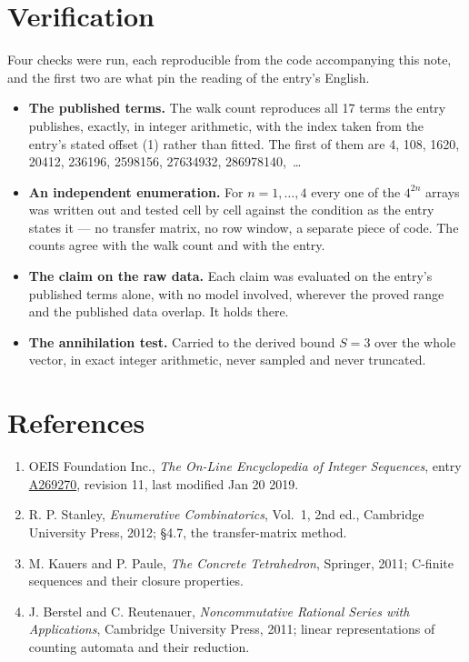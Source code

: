 \documentclass[11pt]{article}
\theoremstyle{definition}
\begin{document}
\section{Verification}

Four checks were run, each reproducible from the code accompanying this note, and the first two are what pin the reading of the entry's English.

\begin{itemize}

\item {\bfseries The published terms.} The walk count reproduces all 17 terms the entry publishes, exactly, in integer arithmetic, with the index taken from the entry's stated offset (1) rather than fitted. The first of them are 4, 108, 1620, 20412, 236196, 2598156, 27634932, 286978140,~\dots

\item {\bfseries An independent enumeration.} For $n = 1,\dots,4$ every one of the $4^{2n}$ arrays was written out and tested cell by cell against the condition as the entry states it --- no transfer matrix, no row window, a separate piece of code. The counts agree with the walk count and with the entry.

\item {\bfseries The claim on the raw data.} Each claim was evaluated on the entry's published terms alone, with no model involved, wherever the proved range and the published data overlap. It holds there.

\item {\bfseries The annihilation test.} Carried to the derived bound $S = 3$ over the whole vector, in exact integer arithmetic, never sampled and never truncated.

\end{itemize}

\section{References}

\begin{enumerate}

\item OEIS Foundation Inc., \emph{The On-Line Encyclopedia of Integer Sequences}, entry \href{https://oeis.org/A269270}{A269270}, revision 11, last modified Jan 20 2019.

\item R. P. Stanley, \emph{Enumerative Combinatorics}, Vol.~1, 2nd ed., Cambridge University Press, 2012; \S4.7, the transfer-matrix method.

\item M. Kauers and P. Paule, \emph{The Concrete Tetrahedron}, Springer, 2011; C-finite sequences and their closure properties.

\item J. Berstel and C. Reutenauer, \emph{Noncommutative Rational Series with Applications}, Cambridge University Press, 2011; linear representations of counting automata and their reduction.

\end{enumerate}
\end{document}
